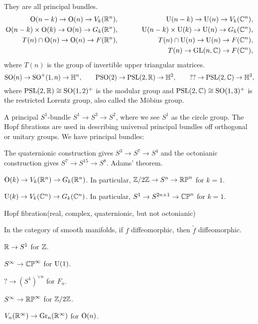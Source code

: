 \documentclass{../../large}
\begin{document}
\begin{prb}
They are all principal bundles.
\begin{alignat*}{2}
\mathrm{O}(n-k)\to\mathrm{O}(n)\to V_k(\mathbb{R}^n),&&\qquad\qquad\qquad\mathrm{U}(n-k)\to\mathrm{U}(n)\to V_k(\mathbb{C}^n),&\\
\mathrm{O}(n-k)\times\mathrm{O}(k)\to\mathrm{O}(n)\to G_k(\mathbb{R}^n),&&\mathrm{U}(n-k)\times\mathrm{U}(k)\to\mathrm{U}(n)\to G_k(\mathbb{C}^n),&\\
T(n)\cap\mathrm{O}(n)\to\mathrm{O}(n)\to F(\mathbb{R}^n),&&T(n)\cap\mathrm{U}(n)\to\mathrm{U}(n)\to F(\mathbb{C}^n),&\\
&&T(n)\to\mathrm{GL}(n,\mathbb{C})\to F(\mathbb{C}^n),&
\end{alignat*}
where $T(n)$ is the group of invertible upper triangular matrices.
\[\mathrm{SO}(n)\to\mathrm{SO}^+(1,n)\to\mathbb{H}^n,\qquad\mathrm{PSO}(2)\to\mathrm{PSL}(2,\mathbb{R})\to\mathbb{H}^2,\qquad ??\to\mathrm{PSL}(2,\mathbb{C})\to\mathbb{H}^3,\]
where $\mathrm{PSL}(2,\mathbb{R})\cong\mathrm{SO}(1,2)^+$ is the modular group and $\mathrm{PSL}(2,\mathbb{C})\cong\mathrm{SO}(1,3)^+$ is the restricted Lorentz group, also called the M\"obius group.
\end{prb}

\begin{prb}
A principal $S^1$-bundle $S^1\to S^3\to S^2$, where we see $S^1$ as the circle group.
The Hopf fibrations are used in describing universal principal bundles off orthogonal or unitary groups.
We have principal bundles:
\begin{parts}
\item The quaternionic construction gives $S^3\to S^7\to S^4$ and the octonianic construction gives $S^7\to S^{15}\to S^8$. Adams' theorem.
\item $\mathrm{O}(k)\to V_k(\mathbb{R}^n)\to G_k(\mathbb{R}^n)$. In particular, $\mathbb{Z}/2\mathbb{Z}\to S^n\to\mathbb{RP}^n$ for $k=1$.
\item $\mathrm{U}(k)\to V_k(\mathbb{C}^n)\to G_k(\mathbb{C}^n)$. In particular, $S^1\to S^{2n+1}\to\mathbb{CP}^n$ for $k=1$.
\end{parts}
\end{prb}


Hopf fibration(real, complex, quaternionic, but not octonianic)

In the category of smooth manifolds, if $f$ diffeomorphic, then $\tilde f$ diffeomorphic.



\begin{prb}
\begin{parts}
\item $\mathbb{R}\to S^1$ for $\mathbb{Z}$.
\item $S^\infty\to\mathbb{CP}^\infty$ for $\mathrm{U}(1)$.
\item $?\to(S^1)^{\vee n}$ for $F_n$.
\item $S^\infty\to\mathbb{RP}^\infty$ for $\mathbb{Z}/2\mathbb{Z}$.
\item $V_n(\mathbb{R}^\infty)\to\mathrm{Gr}_n(\mathbb{R}^\infty)$ for $\mathrm{O}(n)$.
\end{parts}
\end{prb}
\end{document}
